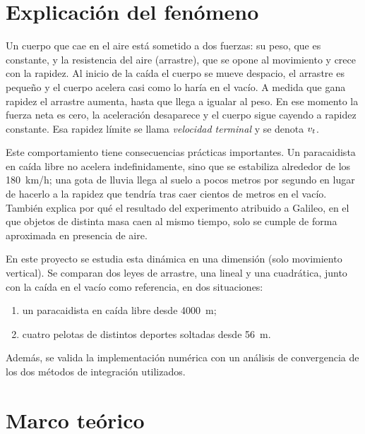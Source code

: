 
\section{Explicación del fenómeno}

Un cuerpo que cae en el aire está sometido a dos fuerzas: su peso, que es constante, y la resistencia del aire (arrastre), que se opone al movimiento y crece con la rapidez. Al inicio de la caída el cuerpo se mueve despacio, el arrastre es pequeño y el cuerpo acelera casi como lo haría en el vacío. A medida que gana rapidez el arrastre aumenta, hasta que llega a igualar al peso. En ese momento la fuerza neta es cero, la aceleración desaparece y el cuerpo sigue cayendo a rapidez constante. Esa rapidez límite se llama \emph{velocidad terminal} y se denota $v_t$.

Este comportamiento tiene consecuencias prácticas importantes. Un paracaidista en caída libre no acelera indefinidamente, sino que se estabiliza alrededor de los \qty{180}{km/h}; una gota de lluvia llega al suelo a pocos metros por segundo en lugar de hacerlo a la rapidez que tendría tras caer cientos de metros en el vacío. También explica por qué el resultado del experimento atribuido a Galileo, en el que objetos de distinta masa caen al mismo tiempo, solo se cumple de forma aproximada en presencia de aire.

En este proyecto se estudia esta dinámica en una dimensión (solo movimiento vertical). Se comparan dos leyes de arrastre, una lineal y una cuadrática, junto con la caída en el vacío como referencia, en dos situaciones:
\begin{enumerate}
  \item un paracaidista en caída libre desde \qty{4000}{m};
  \item cuatro pelotas de distintos deportes soltadas desde \qty{56}{m}.
\end{enumerate}
Además, se valida la implementación numérica con un análisis de convergencia de los dos métodos de integración utilizados.

\section{Marco teórico}

